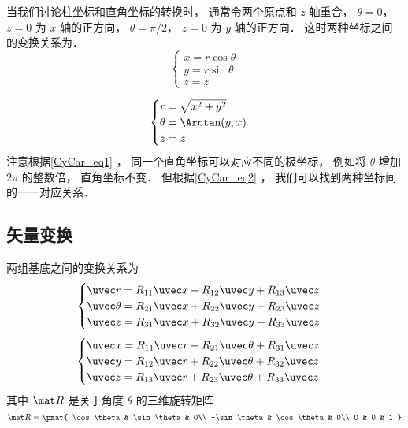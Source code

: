 
\begin{issues}
\issueDraft
\end{issues}

当我们讨论柱坐标和直角坐标的转换时， 通常令两个原点和 $z$ 轴重合， $\theta = 0$， $z = 0$ 为 $x$ 轴的正方向， $\theta = \pi/2$， $z = 0$ 为 $y$ 轴的正方向． 这时两种坐标之间的变换关系为．
\begin{equation}\label{CyCar_eq1}
\begin{cases}
x = r\cos \theta \\
y = r\sin \theta  \\
z = z 
\end{cases}
\end{equation}

\begin{equation}\label{CyCar_eq2}
\begin{cases}
r = \sqrt{x^2+y^2} \\
\theta = \Arctan(y,x)  \\
z = z 
\end{cases}
\end{equation}
注意根据\autoref{CyCar_eq1} ， 同一个直角坐标可以对应不同的极坐标， 例如将 $\theta$ 增加 $2\pi$ 的整数倍， 直角坐标不变． 但根据\autoref{CyCar_eq2} ， 我们可以找到两种坐标间的一一对应关系．
\subsection{矢量变换}
两组基底之间的变换关系为
\begin{equation}\label{CyCar_eq3}
\begin{cases}
\uvec r = R_{11}\uvec x + R_{12}\uvec y + R_{13}\uvec z\\
\uvec \theta = R_{21}\uvec x + R_{22}\uvec y + R_{23}\uvec z\\
\uvec z = R_{31}\uvec x + R_{32}\uvec y + R_{33}\uvec z
\end{cases}
\end{equation}
\begin{equation}
\begin{cases}
\uvec x = R_{11} \uvec r + R_{21} \uvec \theta  + R_{31} \uvec z \\
\uvec y = R_{12} \uvec r + R_{22} \uvec \theta  + R_{32} \uvec z \\
\uvec z = R_{13} \uvec r + R_{23} \uvec \theta  + R_{33} \uvec z
\end{cases}
\end{equation}
其中 $\mat R$ 是关于角度 $\theta$ 的三维旋转矩阵
\begin{equation}
\mat R = \pmat{
    \cos\theta & \sin\theta & 0\\
    -\sin\theta & \cos\theta & 0\\
    0 & 0 & 1
}
\end{equation}

